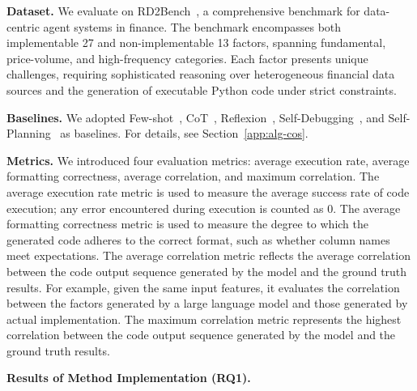 \documentclass{article}
\begin{document}
\textbf{Dataset.} 
We evaluate \ppname{} on RD2Bench~\cite{chen2024rdbench}, a comprehensive benchmark for data-centric agent systems in finance. The benchmark encompasses both implementable 27 and non-implementable 13 factors, spanning fundamental, price-volume, and high-frequency categories. Each factor presents unique challenges, requiring sophisticated reasoning over heterogeneous financial data sources and the generation of executable Python code under strict constraints.

\textbf{Baselines.}
We adopted Few-shot~\cite{brown2020lanugage}, CoT~\cite{wei2022chain}, Reflexion~\cite{shinn2023reflexion}, Self-Debugging~\cite{chen2024teaching}, and Self-Planning~\cite{jiang2023self} as baselines. For details, see Section~\ref{app:alg-cos}.

\textbf{Metrics.} We introduced four evaluation metrics: average execution rate, average formatting correctness, average correlation, and maximum correlation. The average execution rate metric is used to measure the average success rate of code execution; any error encountered during execution is counted as 0. The average formatting correctness metric is used to measure the degree to which the generated code adheres to the correct format, such as whether column names meet expectations. The average correlation metric reflects the average correlation between the code output sequence generated by the model and the ground truth results. For example, given the same input features, it evaluates the correlation between the factors generated by a large language model and those generated by actual implementation. The maximum correlation metric represents the highest correlation between the code output sequence generated by the model and the ground truth results.

\textbf{Results of Method Implementation (RQ1).}
\end{document}
